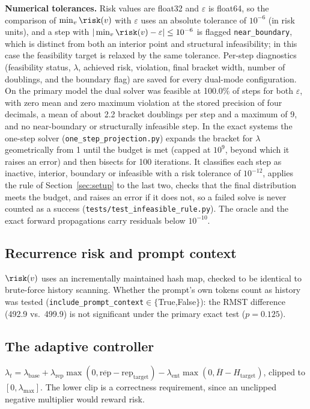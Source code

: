 \textbf{Numerical tolerances.} Risk values are float32 and $\varepsilon$ is float64, so the comparison of $\min_v\risk(v)$ with $\varepsilon$ uses an absolute tolerance of $10^{-6}$ (in risk units), and a step with $|\min_v\risk(v)-\varepsilon|\le10^{-6}$ is flagged \texttt{near\_\allowbreak{}boundary}, which is distinct from both an interior point and structural infeasibility; in this case the feasibility target is relaxed by the same tolerance. Per-step diagnostics (feasibility status, $\lambda$, achieved risk, violation, final bracket width, number of doublings, and the boundary flag) are saved for every dual-mode configuration. On the primary model the dual solver was feasible at 100.0\% of steps for both $\varepsilon$, with zero mean and zero maximum violation at the stored precision of four decimals, a mean of about 2.2 bracket doublings per step and a maximum of 9, and no near-boundary or structurally infeasible step. In the exact systems the one-step solver (\texttt{one\_\allowbreak{}step\_\allowbreak{}projection.py}) expands the bracket for $\lambda$ geometrically from 1 until the budget is met (capped at $10^{9}$, beyond which it raises an error) and then bisects for 100 iterations. It classifies each step as inactive, interior, boundary or infeasible with a risk tolerance of $10^{-12}$, applies the rule of Section~\ref{sec:setup} to the last two, checks that the final distribution meets the budget, and raises an error if it does not, so a failed solve is never counted as a success (\texttt{tests/test\_\allowbreak{}infeasible\_\allowbreak{}rule.py}). The oracle and the exact forward propagations carry residuals below $10^{-10}$.

\subsection{Recurrence risk and prompt context}
$\risk(v)$ uses an incrementally maintained hash map, checked to be identical to brute-force history scanning. Whether the prompt's own tokens count as history was tested (\texttt{include\_\allowbreak{}prompt\_\allowbreak{}context}$\in\{$True,False$\}$): the RMST difference (492.9 vs.\ 499.9) is not significant under the primary exact test ($p{=}0.125$).

\subsection{The adaptive controller}
$\lambda_t=\lambda_{\text{base}}+\lambda_{\text{rep}}\max(0,\overline{\text{rep}}-\text{rep}_{\text{target}})-\lambda_{\text{ent}}\max(0,\overline{H}-H_{\text{target}})$, clipped to $[0,\lambda_{\max}]$. The lower clip is a correctness requirement, since an unclipped negative multiplier would reward risk.

